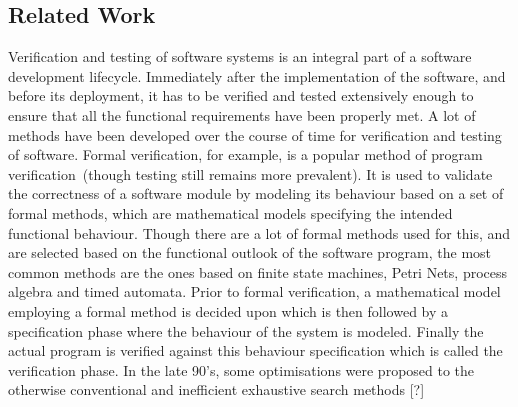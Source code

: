 \raggedbottom
\subsection{Related Work}

Verification and testing of software systems is an integral part of a software development lifecycle. Immediately after the implementation of the software, and before its deployment, it has to be verified and tested extensively enough to ensure that all the functional requirements have been properly met. A lot of methods have been developed over the course of time for verification and testing of software. Formal verification, for example, is a popular method of program verification~(though testing still remains more prevalent). It is used to validate the correctness of a software module by modeling its behaviour based on a set of formal methods, which are mathematical models specifying the intended functional behaviour. Though there are a lot of formal methods used for this, and are selected based on the functional outlook of the software program, the most common methods are the ones based on finite state machines, Petri Nets, process algebra and timed automata. Prior to formal verification, a mathematical model employing a formal method is decided upon which is then followed by a specification phase where the behaviour of the system is modeled. Finally the actual program is verified against this behaviour specification which is called the verification phase. In the late 90's, some optimisations were proposed to the otherwise conventional and inefficient exhaustive search methods [?] %

